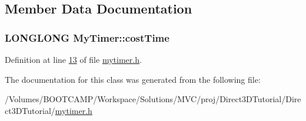 \subsection{Member Data Documentation}
\hypertarget{class_my_timer_adef1d73f6cbdc533c45766b6fa739154}{
\subsubsection[{costTime}]{\setlength{\rightskip}{0pt plus 5cm}LONGLONG {\bf MyTimer::costTime}}}
\label{class_my_timer_adef1d73f6cbdc533c45766b6fa739154}


Definition at line \hyperlink{mytimer_8h_source_l00013}{13} of file \hyperlink{mytimer_8h_source}{mytimer.h}.



The documentation for this class was generated from the following file:\begin{DoxyCompactItemize}
\item 
/Volumes/BOOTCAMP/Workspace/Solutions/MVC/proj/Direct3DTutorial/Direct3DTutorial/\hyperlink{mytimer_8h}{mytimer.h}\end{DoxyCompactItemize}

